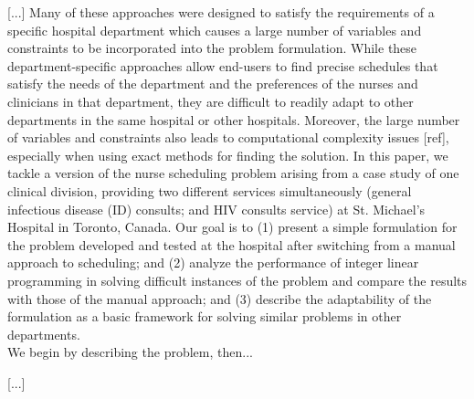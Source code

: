 
[...] Many of these approaches were designed to satisfy the requirements of a specific hospital department which causes a large number of variables and constraints to be incorporated into the problem formulation. While these department-specific approaches allow end-users to find precise schedules that satisfy the needs of the department and the preferences of the nurses and clinicians in that department, they are difficult to readily adapt to other departments in the same hospital or other hospitals. %
Moreover, the large number of variables and constraints also leads to computational complexity issues [ref], especially when using exact methods for finding the solution. In this paper, we tackle a version of the nurse scheduling problem arising from a case study of one clinical division, providing two different services simultaneously (general infectious disease (ID) consults; and HIV consults service) at St. Michael's Hospital in Toronto, Canada. Our goal is to (1) present a simple formulation for the problem developed and tested at the hospital after switching from a manual approach to scheduling; and (2) analyze the performance of integer linear programming in solving difficult instances of the problem and compare the results with those of the manual approach; and (3) describe the adaptability of the formulation as a basic framework for solving similar problems in other departments. \\ %
We begin by describing the problem, then...%

[...]

